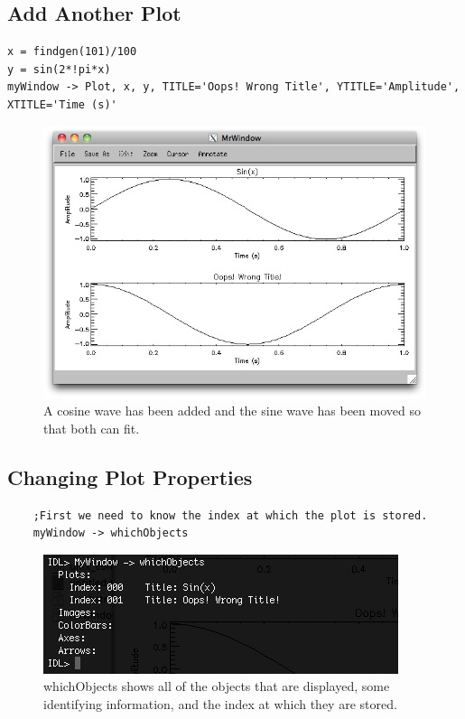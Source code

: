 \documentclass[12pt, letterpaper, oneside]{article}		%
\begin{document}
\subsection{Add Another Plot}

\begin{lstlisting}
x = findgen(101)/100
y = sin(2*!pi*x)
myWindow -> Plot, x, y, TITLE='Oops! Wrong Title', YTITLE='Amplitude', XTITLE='Time (s)'
\end{lstlisting}

\begin{figure}[h!]
  \centering
  \includegraphics[width=0.5 \textwidth]{./figures/Sine-Cosine-Wrong-Title.png}
  \caption[Add a Cosine Wave.]
   {A cosine wave has been added and the sine wave has been moved so that both can fit.}
\end{figure}

\subsection{Changing Plot Properties}

\begin{lstlisting}
    ;First we need to know the index at which the plot is stored.
    myWindow -> whichObjects
\end{lstlisting}

\begin{figure}[h!]
  \centering
  \includegraphics[width=0.75 \textwidth]{./figures/whichObjects.png}
  \caption[whichObjects.]
   {whichObjects shows all of the objects that are displayed, some identifying information, and the index at which they are stored.}
\end{figure}
\end{document}
